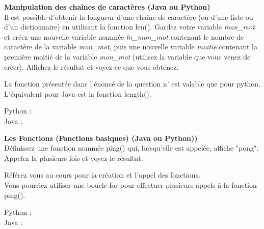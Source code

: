\begin{Exercice}[20 minutes] \textbf{Manipulation des chaînes de caractères (Java ou Python)}\\
   Il est possible d'obtenir la longueur d'une chaîne de caractère (ou d'une liste ou d'un dictionnaire) en utilisant la fonction len(). Gardez votre variable \textit{mon\_mot} et créez une nouvelle variable nommée \textit{ln\_mon\_mot} contenant le nombre de caractère de la variable \textit{mon\_mot}, puis une nouvelle variable \textit{moitie} contenant la première moitié de la variable \textit{mon\_mot} (utilisez la variable que vous venez de créer). Affichez le résultat et voyez ce que vous obtenez.   \\
   
    \begin{conseil}
      	La fonction présentée dans l'énoncé de la question n' est valable que pour python. L'équivalent pour Java est la fonction length().
        
    \end{conseil}
    \begin{solution}
    
    Python : \\
    
    
    
    Java : \\
    
    
           
    \end{solution}   
\end{Exercice}

\begin{Exercice}[20 minutes] \textbf{Les Fonctions (Fonctions basiques) (Java ou Python))}\\
  Définissez une fonction nommée ping() qui, lorsqu'elle est appelée, affiche "pong". Appelez la plusieurs fois et voyez le résultat.  \\
   
    \begin{conseil}
		Référez vous au cours pour la création et l'appel des fonctions. \\
      	
      	Vous pourriez utiliser une boucle for pour effectuer plusieurs appels à la fonction ping().
        
    \end{conseil}
    \begin{solution}
    
    Python : \\
    
    
    
    Java : \\
    
    
           
    \end{solution}   
\end{Exercice}

